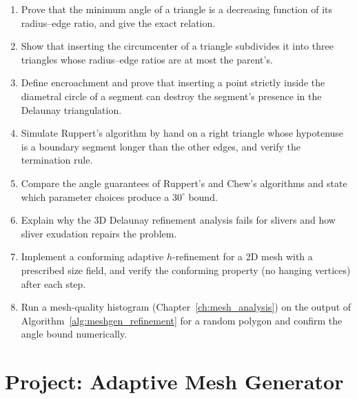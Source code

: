 \begin{enumerate}
  \item Prove that the minimum angle of a triangle is a decreasing function
    of its radius--edge ratio, and give the exact relation.
  \item Show that inserting the circumcenter of a triangle subdivides it
    into three triangles whose radius--edge ratios are at most the parent's.
  \item Define encroachment and prove that inserting a point strictly
    inside the diametral circle of a segment can destroy the segment's
    presence in the Delaunay triangulation.
  \item Simulate Ruppert's algorithm by hand on a right triangle whose
    hypotenuse is a boundary segment longer than the other edges, and
    verify the termination rule.
  \item Compare the angle guarantees of Ruppert's and Chew's algorithms and
    state which parameter choices produce a $30^\circ$ bound.
  \item Explain why the 3D Delaunay refinement analysis fails for slivers
    and how sliver exudation repairs the problem.
  \item Implement a conforming adaptive $h$-refinement for a 2D mesh with a
    prescribed size field, and verify the conforming property (no hanging
    vertices) after each step.
  \item Run a mesh-quality histogram (Chapter~\ref{ch:mesh_analysis}) on
    the output of Algorithm~\ref{alg:meshgen_refinement} for a random
    polygon and confirm the angle bound numerically.
\end{enumerate}

\section{Project: Adaptive Mesh Generator}
\label{sec:meshgen_project}

